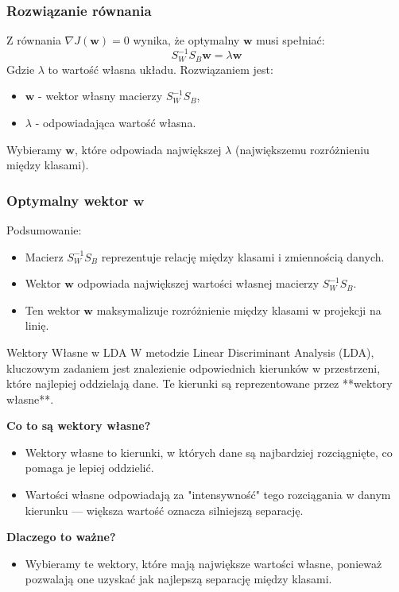 \documentclass{beamer}
\begin{document}
\begin{frame}
    \frametitle{Rozwiązanie równania}
    Z równania \(\nabla J(\mathbf{w}) = 0\) wynika, że optymalny \(\mathbf{w}\) musi spełniać:
    \[
    S_W^{-1} S_B \mathbf{w} = \lambda \mathbf{w}
    \]
    Gdzie \(\lambda\) to wartość własna układu. Rozwiązaniem jest:
    \begin{itemize}
        \item \(\mathbf{w}\) - wektor własny macierzy \(S_W^{-1} S_B\),
        \item \(\lambda\) - odpowiadająca wartość własna.
    \end{itemize}
    Wybieramy \(\mathbf{w}\), które odpowiada największej \(\lambda\) (największemu rozróżnieniu między klasami).
\end{frame}

\begin{frame}
    \frametitle{Optymalny wektor \(\mathbf{w}\)}
    Podsumowanie:
    \begin{itemize}
        \item Macierz \(S_W^{-1} S_B\) reprezentuje relację między klasami i zmiennością danych.
        \item Wektor \(\mathbf{w}\) odpowiada największej wartości własnej macierzy \(S_W^{-1} S_B\).
        \item Ten wektor \(\mathbf{w}\) maksymalizuje rozróżnienie między klasami w projekcji na linię.
    \end{itemize}
\end{frame}


\begin{frame}{Wektory Własne w LDA}
    W metodzie Linear Discriminant Analysis (LDA), kluczowym zadaniem jest znalezienie odpowiednich kierunków w przestrzeni, które najlepiej oddzielają dane.
    Te kierunki są reprezentowane przez **wektory własne**.

    \bigskip
    \textbf{Co to są wektory własne?}  
    \begin{itemize}
        \item Wektory własne to kierunki, w których dane są najbardziej rozciągnięte, co pomaga je lepiej oddzielić.
        \item Wartości własne odpowiadają za "intensywność" tego rozciągania w danym kierunku — większa wartość oznacza silniejszą separację.
    \end{itemize}

    \bigskip
    \textbf{Dlaczego to ważne?}  
    \begin{itemize}
        \item Wybieramy te wektory, które mają największe wartości własne, ponieważ pozwalają one uzyskać jak najlepszą separację między klasami.
    \end{itemize}
\end{frame}
\end{document}
